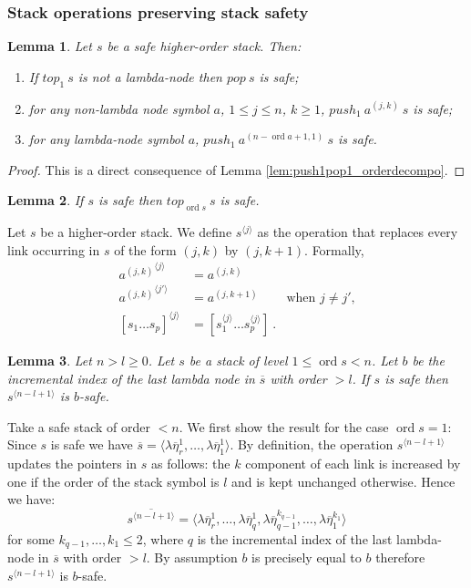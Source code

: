 \documentclass{article}
\newcommand{\ord}{\mathop{\mathrm{ord}}}
\newtheorem{lemma}{Lemma}[section]
\theoremstyle{remark}
\theoremstyle{definition}
\newcommand\orddec\overline
\begin{document}
\subsubsection{Stack operations preserving stack safety}
\begin{lemma}
\label{lem:push1pop1_preserves_safety} Let $s$ be a safe higher-order
stack. Then:
\begin{enumerate}
  \item If $top_1\ s$ is not a lambda-node then $pop\ s$ is safe;
  \item for any non-lambda node symbol $a$, $1 \leq j \leq n$, $k \geq 1$, $push_1\ a^{(j,k)}\ s$ is safe;
  \item for any lambda-node symbol $a$, $push_1\ a^{(n-\ord{a}+1,1)}\ s$ is safe.
\end{enumerate}
\end{lemma}
\begin{proof}
This is a direct consequence of Lemma
\ref{lem:push1pop1_orderdecompo}.
\end{proof}


\begin{lemma}
\label{lem:top_qsafe} If $s$ is safe then $top_{\ord{s}}~s$ is safe.
\end{lemma}


Let $s$ be a higher-order stack. We define $s^{\langle j \rangle}$ as the operation that replaces
every link occurring in $s$ of the form $(j,k)$ by $(j,k+1)$. Formally,
\begin{align*}
{a^{(j,k)}}^{\langle j \rangle} &= a^{(j,k)}   \\
{a^{(j,k)}}^{\langle j' \rangle} &= a^{(j,k+1)} &   \mbox{when $j\neq j'$,}\\
[s_1 \ldots s_p]^{\langle j \rangle} &= [s_1^{\langle j \rangle} \ldots s_p^{\langle j \rangle}] \ .
\end{align*}

\begin{lemma}
\label{lem:incrk_qsafe}
Let $n>l\geq 0$. Let $s$ be a stack of level $1\leq \ord{s} <n$.
 Let $b$ be the incremental index of the last lambda node in $\orddec{s}$
 with order $>l$.
If $s$ is safe then $s^{\langle n-l+1 \rangle}$ is $b$-safe.
\end{lemma}
\proof Take a safe stack of order $<n$.
 We first show the result for the case $\ord{s} = 1$:
Since $s$ is safe we have
$\orddec{s} = \langle \lambda \overline{\eta}_r^1
, \ldots, \lambda \overline{\eta}_1^1   \rangle$.
By definition, the operation $s^{\langle n-l+1 \rangle}$ updates the pointers in $s$  as follows:
the $k$ component of each link is increased by one if the order of
the stack symbol is $l$ and is kept unchanged otherwise.
Hence we have:
\begin{equation*}
\orddec{s^{\langle n-l+1 \rangle}} = \langle
\lambda \overline{\eta}_r^1, \ldots,  \lambda \overline{\eta}_{q}^1, \lambda \overline{\eta}_{q-1}^{k_{q-1}}, \ldots,
 \lambda \overline{\eta}_1^{k_1} \rangle
\end{equation*}
for some $k_{q-1}, \ldots , k_1 \leq 2$, where $q$ is the incremental index of the last lambda-node in $\orddec{s}$ with order $>l$. By assumption $b$ is precisely equal to $b$ therefore $s^{\langle n-l+1 \rangle}$ is $b$-safe.
\end{document}
